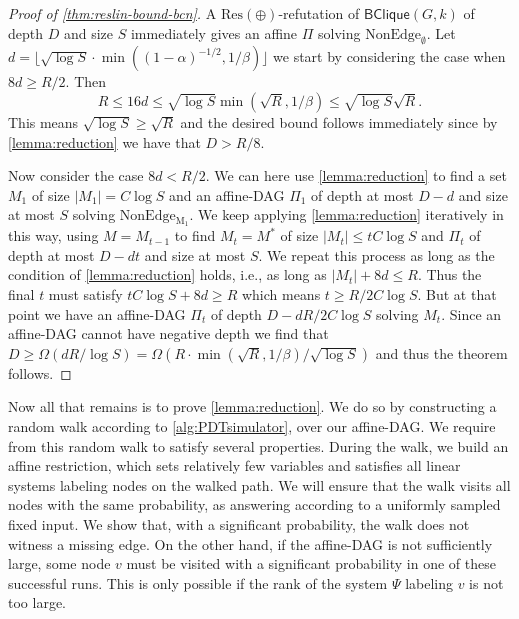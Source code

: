 \documentclass[10pt,a4paper]{article}
\theoremstyle{definition}
\theoremstyle{remark}
\theoremstyle{example}
\theoremstyle{plain}
\newcommand{\CNbound}{R}
\newcommand{\ResLin}{\textrm{Res}(\oplus)}
\newcommand{\binClique}[2]{\mathsf{BClique}({#1}, {#2})}
\newcommand{\binCliqueGk}{\binClique{G}{k}}
\newcommand{\affineDAG}{\Pi}
\newcommand{\edgeProbResLin}{\alpha}
\begin{document}
\begin{proof}[Proof of \autoref{thm:reslin-bound-bcn}]
A $\ResLin$-refutation of $\binCliqueGk$ of depth $D$ and size $S$ immediately gives an affine $\affineDAG$ solving $\mathrm{NonEdge}_\emptyset$. Let $d=\lfloor \sqrt{\log S} \cdot \min((1-\edgeProbResLin)^{-1/2},1/\beta)\rfloor$ we start by considering the case when $8d\geq R/2$. Then \begin{equation*}
    R\leq 16d \leq \sqrt{\log S} \min(\sqrt \CNbound,1/\beta)\leq \sqrt{\log S}\sqrt{\CNbound}. 
\end{equation*}
This means $\sqrt{\log S} \geq \sqrt{R}$ and the desired bound follows immediately since by
\autoref{lemma:reduction} we have that $D > R/8$.

Now consider the case $8d<R/2$. We can here use \autoref{lemma:reduction} to find a set $M_1$ of size $|M_1|=C\log S$ and an affine-DAG $\affineDAG_1$ of depth at most $D-d$ and size at most $S$ solving $\mathrm{NonEdge_{M_1}}$. 
We keep applying \autoref{lemma:reduction} iteratively in this way, using $M=M_{t-1}$ to find $M_{t} = M^*$ of size $|M_t|\leq tC\log S$ and $\affineDAG_t$ of depth at most $D-dt$ and size at most $S$. We repeat this process as long as the condition of \autoref{lemma:reduction} holds, i.e., as long as $|M_t|+ 8d \leq \CNbound$. 
Thus the final $t$ must satisfy $tC\log S +8d \geq \CNbound$ which means $t \geq \CNbound/2C\log S$. But at that point we have an affine-DAG $\affineDAG_t$ of depth $D-d\CNbound/2C\log S$ solving $M_t$.
Since an affine-DAG cannot have negative depth we find that $D \geq \Omega(d\CNbound/\log S) = \Omega(\CNbound \cdot \min(\sqrt{\CNbound},1/\beta)/\sqrt{\log S})$ and thus the theorem follows.
\end{proof}

Now all that remains is to prove \autoref{lemma:reduction}. We do so by constructing a random walk according to \autoref{alg:PDTsimulator}, over our affine-DAG. We require from this random walk to satisfy several properties. During the walk, we build an affine restriction, which sets relatively few variables and satisfies all linear systems labeling nodes on the walked path. 
We will ensure that the walk visits all nodes with the same probability, as answering according to a uniformly sampled fixed input.
We show that, with a significant probability, the walk does not witness a missing edge. On the other hand, if the affine-DAG is not sufficiently large, some node $v$ must be visited with a significant probability in one of these successful runs. This is only possible if the rank of the system $\Psi$ labeling $v$ is not too large. 
\end{document}

